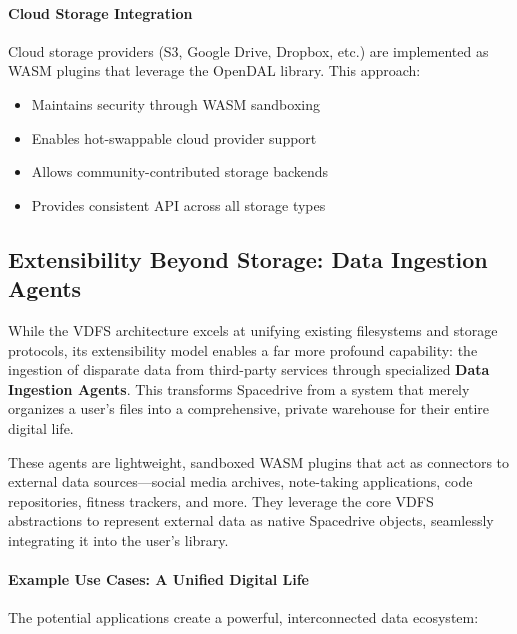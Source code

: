 \documentclass[sigconf]{acmart}
\begin{document}
\paragraph{Cloud Storage Integration}
Cloud storage providers (S3, Google Drive, Dropbox, etc.) are implemented as WASM plugins that leverage the OpenDAL library. This approach:
\begin{itemize}
    \item Maintains security through WASM sandboxing
    \item Enables hot-swappable cloud provider support
    \item Allows community-contributed storage backends
    \item Provides consistent API across all storage types
\end{itemize}

\subsection{Extensibility Beyond Storage: Data Ingestion Agents}
\label{sec:data-ingestion-agents}

While the VDFS architecture excels at unifying existing filesystems and storage protocols, its extensibility model enables a far more profound capability: the ingestion of disparate data from third-party services
through specialized \textbf{Data Ingestion Agents}. This transforms Spacedrive from a system that merely organizes a user's files into a comprehensive, private warehouse for their entire digital life.

These agents are lightweight, sandboxed WASM plugins that act as connectors to external data sources—social media archives, note-taking applications, code repositories, fitness trackers, and more. They leverage the
core VDFS abstractions to represent external data as native Spacedrive objects, seamlessly integrating it into the user's library.


\paragraph{Example Use Cases: A Unified Digital Life}
The potential applications create a powerful, interconnected data ecosystem:
\end{document}
